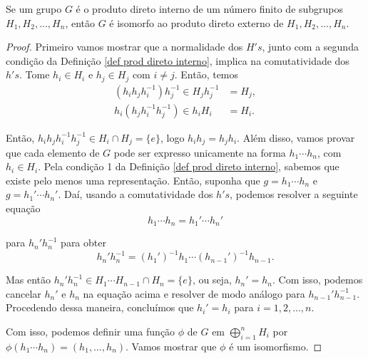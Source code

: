 	\begin{theorem}
	\label{isomorfismo entre interno e externo}
		Se um grupo $G$ é o produto direto interno de um número finito de subgrupos 
		$H_1, H_2, \dots, H_n$, então $G$ é isomorfo ao produto direto externo de $H_1, H_2, \dots, H_n$.
	\end{theorem}
	\begin{proof}
		Primeiro vamos mostrar que a normalidade dos $H's$, junto com a segunda condição da 
		Definição \ref{def prod direto interno}, implica na comutatividade dos $h's$. 
		Tome $h_i\in H_i$ e $h_j\in H_j$ com $i\neq j$. Então, temos
		\begin{align*}  
		    (h_ih_jh_i^{-1})h_j^{-1} \in H_jh_j^{-1} &= H_j, \\
		    h_i(h_jh_i^{-1}h_j^{-1}) \in h_iH_i &= H_i.
		\end{align*}
		\par\vspace{0.3cm} Então, $h_ih_jh_i^{-1}h_j^{-1}\in H_i\cap H_j = \{e\}$, logo $h_ih_j = h_jh_i$. 
		Além disso, vamos provar que cada elemento de $G$ pode ser expresso unicamente na forma 
		$h_1\cdots h_n$, com $h_i\in H_i$. Pela condição 1 da Definição \ref{def prod direto interno}, 
		sabemos que existe pelo menos uma representação. Então, suponha que $g = h_1\cdots h_n$ 
		e $g = h_1'\cdots h_n'$. Daí, usando a comutatividade dos $h's$, podemos resolver a seguinte equação
		\begin{equation*}
		    h_1\cdots h_n = h_1'\cdots h_n'
		\end{equation*}
		\par\vspace{0.3cm} para $h_n'h_n^{-1}$ para obter
		\begin{equation*}
		    h_n'h_n^{-1} = (h_1')^{-1}h_1\cdots (h_{n-1}')^{-1}h_{n-1}.
		\end{equation*}
		\par\vspace{0.3cm} Mas então $h_n'h_n^{-1}\in H_1\cdots H_{n-1}\cap H_n = \{e\}$, ou seja, 
		$h_n' = h_n$. Com isso, podemos cancelar $h_n'$ e $h_n$ na equação acima e resolver de modo 
		análogo para $h_{n-1}'h_{n-1}^{-1}$. Procedendo dessa maneira, concluímos que $h_i' = h_i$ 
		para $i = 1, 2, \dots, n$.
		
		\par\vspace{0.3cm} Com isso, podemos definir uma função $\phi$ de $G$ em 
		$\displaystyle{\bigoplus_{i = 1}^{n}H_i}$ por $\phi(h_1\cdots h_n) = (h_1, \dots, h_n)$. 
		Vamos mostrar que $\phi$ é um isomorfismo.
		

\end{proof}
